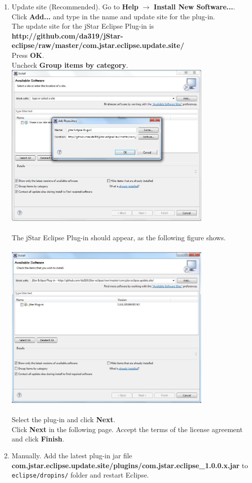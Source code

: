 \documentclass{article}
\begin{document}
\begin{enumerate}
\item Update site (Recommended). Go to {\bf  Help} $\rightarrow$ {\bf Install New Software...}. Click {\bf Add...}  and type in the name and update site for the plug-in. \\ The update site for the jStar Eclipse Plug-in is \\ {\bf http://github.com/da319/jStar-eclipse/raw/master/com.jstar.eclipse.update.site/}\\
Press {\bf OK}.\\
Uncheck {\bf Group items by category}.\\
\includegraphics[width=4in]{images/updateSite1.jpg}\\\\
The jStar Eclipse Plug-in should appear, as the following figure shows.\\\\
\includegraphics[width=4in]{images/updateSite2.jpg}\\\\
Select the plug-in and click {\bf Next}.\\
Click {\bf Next} in the following page.
Accept the terms of the license agreement and click {\bf Finish}.
\item Manually. Add the latest plug-in jar file\\ \textbf{com.jstar.eclipse.update.site/plugins/com.jstar.eclipse\_1.0.0.x.jar} to \texttt{eclipse/dropins/} folder and restart Eclipse.
\end{enumerate}
\end{document}
